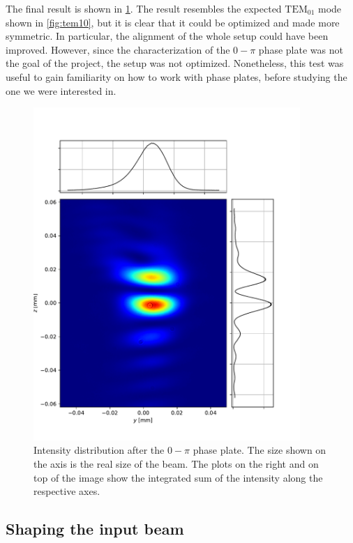 The final result is shown in \cref{fig:0pi_image}. The result resembles the expected $\text{TEM}_{01}$ mode shown in \cref{fig:tem10}, but it is clear that it could be optimized and made more symmetric. In particular, the alignment of the whole setup could have been improved.  However, since the characterization of the $0-\pi$ phase plate was not the goal of the project, the setup was not optimized. Nonetheless, this test was useful to gain familiarity on how to work with phase plates, before studying the one we were interested in.

\begin{figure}
    \centering
    \includegraphics[width=0.9\textwidth]{chapters/chapter_3/figures/0pi_image.pdf}
    \caption{Intensity distribution after the $0-\pi$ phase plate. The size shown on the axis is the real size of the beam. The plots on the right and on top of the image show the integrated sum of the intensity along the respective axes.}
    \label{fig:0pi_image}
\end{figure}

\subsection{Shaping the input beam}

